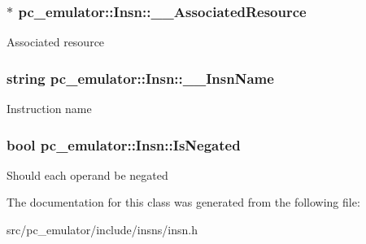 \subsubsection[{\texorpdfstring{\+\_\+\+\_\+\+Associated\+Resource}{__AssociatedResource}}]{$\ast$ pc\+\_\+emulator\+::\+Insn\+::\+\_\+\+\_\+\+Associated\+Resource}\hypertarget{classpc__emulator_1_1Insn_ae7cb9ec6f9eff913027042ad4e253bd4}{}\label{classpc__emulator_1_1Insn_ae7cb9ec6f9eff913027042ad4e253bd4}
Associated resource 
\subsubsection[{\texorpdfstring{\+\_\+\+\_\+\+Insn\+Name}{__InsnName}}]{\setlength{\rightskip}{0pt plus 5cm}string pc\+\_\+emulator\+::\+Insn\+::\+\_\+\+\_\+\+Insn\+Name}\hypertarget{classpc__emulator_1_1Insn_a7921073748a0e77469b19bad52b0518b}{}\label{classpc__emulator_1_1Insn_a7921073748a0e77469b19bad52b0518b}
Instruction name 
\subsubsection[{\texorpdfstring{Is\+Negated}{IsNegated}}]{\setlength{\rightskip}{0pt plus 5cm}bool pc\+\_\+emulator\+::\+Insn\+::\+Is\+Negated}\hypertarget{classpc__emulator_1_1Insn_a41aa1d28ef8bcf15ca05faaa1ccea018}{}\label{classpc__emulator_1_1Insn_a41aa1d28ef8bcf15ca05faaa1ccea018}
Should each operand be negated 

The documentation for this class was generated from the following file\+:\begin{DoxyCompactItemize}
\item 
src/pc\+\_\+emulator/include/insns/insn.\+h\end{DoxyCompactItemize}
